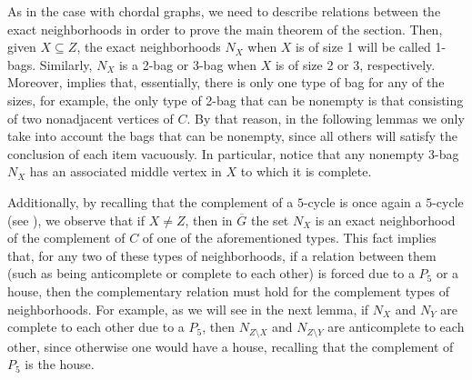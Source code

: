 As in the case with chordal graphs, we need to describe relations between the
exact neighborhoods in order to prove the main theorem of the section. Then,
given $X\subseteq Z$, the exact neighborhoods $N_X$ when $X$ is of size 1 will
be called 1-bags. Similarly, $N_X$ is a 2-bag or 3-bag when $X$ is of size 2 or
3, respectively. Moreover,  implies that,
essentially, there is only one type of bag for any of the sizes, for example,
the only type of 2-bag that can be nonempty is that consisting of two
nonadjacent vertices of $C$. By that reason, in the following lemmas we only
take into account the bags that can be nonempty, since all others will satisfy
the conclusion of each item vacuously. In particular, notice that any nonempty
3-bag $N_X$ has an associated middle vertex in $X$ to which it is complete.

Additionally, by recalling that the complement of a $5$-cycle is once again a
$5$-cycle (see ), we observe that if $X \neq Z$, then in
$\overline{G}$ the set $N_X$ is an exact neighborhood of the complement of $C$
of one of the aforementioned types.  This fact implies that, for any two of
these types of neighborhoods, if a relation between them (such as being
anticomplete or complete to each other) is forced due to a $P_5$ or a house,
then the complementary relation must hold for the complement types of
neighborhoods. For example, as we will see in the next lemma, if $N_X$ and $N_Y$
are complete to each other due to a $P_5$, then $N_{Z \setminus X}$ and $N_{Z
\setminus Y}$ are anticomplete to each other, since otherwise one would have a
house, recalling that the complement of $P_5$ is the house.

